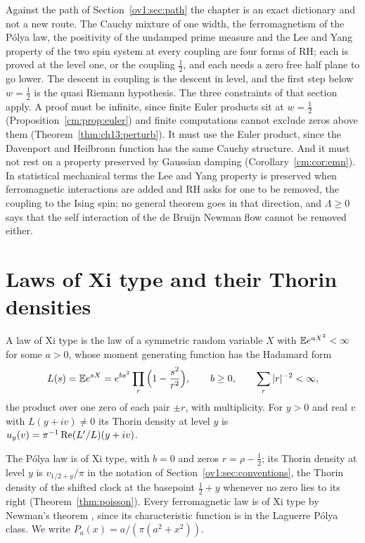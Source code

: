 Against the path of Section~\ref{ov1:sec:path} the chapter is an exact dictionary and not a new route. The Cauchy mixture of one width, the ferromagnetism of the P\'olya law, the positivity of the undamped prime measure and the Lee and Yang property of the two spin system at every coupling are four forms of RH; each is proved at the level one, or the coupling $\frac12$, and each needs a zero free half plane to go lower. The descent in coupling is the descent in level, and the first step below $w=\frac12$ is the quasi Riemann hypothesis. The three constraints of that section apply. A proof must be infinite, since finite Euler products sit at $w=\frac12$ (Proposition~\ref{cm:prop:euler}) and finite computations cannot exclude zeros above them (Theorem~\ref{thm:ch13:perturb}). It must use the Euler product, since the Davenport and Heilbronn function has the same Cauchy structure. And it must not rest on a property preserved by Gaussian damping (Corollary~\ref{cm:cor:emn}). In statistical mechanical terms the Lee and Yang property is preserved when ferromagnetic interactions are added and RH asks for one to be removed, the coupling to the Ising spin; no general theorem goes in that direction, and $\Lambda\ge0$ says that the self interaction of the de Bruijn Newman flow cannot be removed either.

\section{Laws of Xi type and their Thorin densities}\label{cm:sec:setting}

\begin{definition}\label{cm:def:X}
A law of Xi type is the law of a symmetric random variable $X$ with $\mathbb{E} e^{aX^2}<\infty$ for some $a>0$, whose moment generating function has the Hadamard form
\[
L(s)=\mathbb{E} e^{sX}=e^{bs^2}\prod_r\Big(1-\frac{s^2}{r^2}\Big),\qquad b\ge0,\qquad\sum_r|r|^{-2}<\infty,
\]
the product over one zero of each pair $\pm r$, with multiplicity. For $y>0$ and real $v$ with $L(y+iv)\ne0$ its Thorin density at level $y$ is $u_y(v)=\pi^{-1}\operatorname{Re}(L'/L)(y+iv)$.
\end{definition}

The P\'olya law is of Xi type, with $b=0$ and zeros $r=\rho-\frac12$; its Thorin density at level $y$ is $v_{1/2+y}/\pi$ in the notation of Section~\ref{ov1:sec:conventions}, the Thorin density of the shifted clock at the basepoint $\frac12+y$ whenever no zero lies to its right (Theorem~\ref{thm:poisson}). Every ferromagnetic law is of Xi type by Newman's theorem \cite{Newman74}, since its characteristic function is in the Laguerre P\'olya class. We write $P_a(x)=a/(\pi(a^2+x^2))$.

